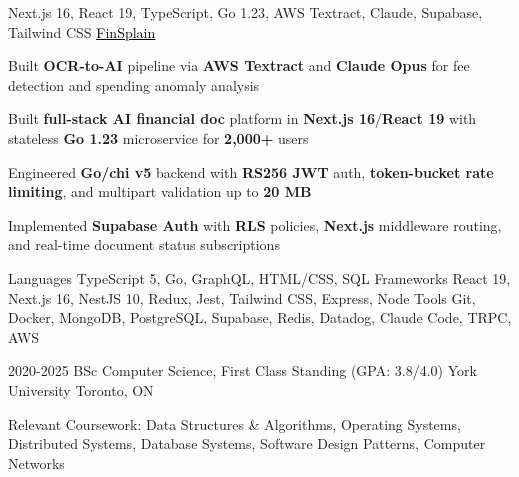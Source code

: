 \documentclass[11pt, a4paper]{awesome-cv}
\begin{document}
\begin{cventries}
\end{cventries}


\begin{cventries}

  \cventry
  {Next.js 16, React 19, TypeScript, Go 1.23, AWS Textract, Claude, Supabase, Tailwind CSS}
  {\href{https://finsplain.net}{\textcolor{black}{\underline{FinSplain}} \faExternalLink}}
  {}
  {}
  {
    \begin{cvitems}
      \item {Built \textbf{OCR-to-AI} pipeline via \textbf{AWS Textract} and \textbf{Claude Opus} for fee detection and spending anomaly analysis}
      \item {Built \textbf{full-stack AI financial doc} platform in \textbf{Next.js 16}/\textbf{React 19} with stateless \textbf{Go 1.23} microservice for \textbf{2,000+} users}
      \item {Engineered \textbf{Go/chi v5} backend with \textbf{RS256 JWT} auth, \textbf{token-bucket rate limiting}, and multipart validation up to \textbf{20 MB}}
      \item {Implemented \textbf{Supabase Auth} with \textbf{RLS} policies, \textbf{Next.js} middleware routing, and real-time document status subscriptions}
    \end{cvitems}
  }

\end{cventries}


\begin{cvskills}
  \cvskill
  {Languages}
  {TypeScript 5, Go, GraphQL, HTML/CSS, SQL}
  \cvskill
  {Frameworks}
  {React 19, Next.js 16, NestJS 10, Redux, Jest, Tailwind CSS, Express, Node}
  \cvskill
  {Tools}
  {Git, Docker, MongoDB, PostgreSQL, Supabase, Redis, Datadog, Claude Code, TRPC, AWS}
\end{cvskills}

\vspace{-2mm}

\begin{cventries}
  \cventry
  {2020-2025}
  {BSc Computer Science, First Class Standing (GPA: 3.8/4.0)}
  {York University}
  {Toronto, ON}
  {%
    \begin{cvitems}
      \item {Relevant Coursework: Data Structures \& Algorithms, Operating Systems, Distributed Systems, Database Systems, Software Design Patterns, Computer Networks}
    \end{cvitems}
  }
\end{cventries}

\end{document}
